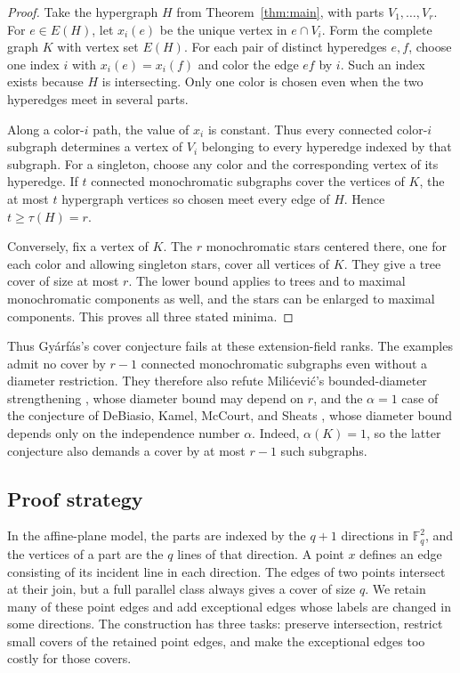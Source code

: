 \documentclass[11pt]{article}
\theoremstyle{remark}
\newcommand{\F}{\mathbb F}
\begin{document}
\begin{proof}
Take the hypergraph $H$ from Theorem~\ref{thm:main}, with parts
$V_1,\ldots,V_r$. For $e\in E(H)$, let $x_i(e)$ be the unique vertex in
$e\cap V_i$. Form the complete graph $K$ with vertex set $E(H)$. For each
pair of distinct hyperedges $e,f$, choose one index $i$ with
$x_i(e)=x_i(f)$ and color the edge $ef$ by $i$. Such an index exists
because $H$ is intersecting. Only one color is chosen even when the two
hyperedges meet in several parts.

Along a color-$i$ path, the value of $x_i$ is constant. Thus every connected
color-$i$ subgraph determines a vertex of $V_i$ belonging to every
hyperedge indexed by that subgraph. For a singleton, choose any color and
the corresponding vertex of its hyperedge. If $t$ connected monochromatic
subgraphs cover the vertices of $K$, the at most $t$ hypergraph vertices so
chosen meet every edge of $H$. Hence $t\ge\tau(H)=r$.

Conversely, fix a vertex of $K$. The $r$ monochromatic stars centered there,
one for each color and allowing singleton stars, cover all vertices of $K$.
They give a tree cover of size at most $r$. The lower bound applies to trees
and to maximal monochromatic components as well, and the stars can be
enlarged to maximal components. This proves all three stated minima.
\end{proof}

Thus Gy\'arf\'as's cover conjecture fails at these extension-field ranks.
The examples admit no cover by $r-1$ connected monochromatic subgraphs even
without a diameter restriction. They therefore also refute Mili\'cevi\'c's
bounded-diameter strengthening \cite[Conjecture~6]{Milicevic2017}, whose
diameter bound may depend on $r$, and the $\alpha=1$ case of the conjecture
of DeBiasio, Kamel, McCourt, and Sheats
\cite[Conjecture~2.8]{DeBiasioKamelMcCourtSheats2021}, whose diameter bound
depends only on the independence number $\alpha$. Indeed, $\alpha(K)=1$,
so the latter conjecture also demands a cover by at most $r-1$ such
subgraphs.

\subsection*{Proof strategy}

In the affine-plane model, the parts are indexed by the $q+1$ directions
in $\F_q^2$, and the vertices of a part are the $q$ lines of that
direction. A point $x$ defines an edge consisting of its incident line
in each direction. The edges of two points intersect at their join,
but a full parallel class always gives a cover of size $q$. We retain
many of these point edges and add exceptional edges whose labels are
changed in some directions. The construction has three tasks: preserve
intersection, restrict small covers of the retained point edges, and
make the exceptional edges too costly for those covers.
\end{document}
